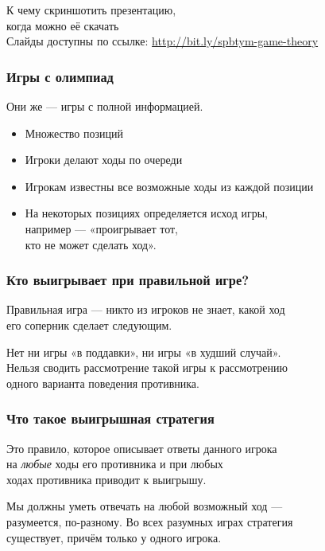 \begin{frame} \begin{center}
	{\Large К чему скриншотить презентацию,\smallskip\\
		когда можно её скачать} \\ [0.9cm]
	{\small Слайды доступны по ссылке: \url{http://bit.ly/spbtym-game-theory}}
\end{center} \end{frame}

\begin{frame} \frametitle{Игры с олимпиад}
	Они же — игры с полной информацией.

\begin{itemize} \itemsep=2.25mm
	\item Множество позиций
	\item Игроки делают ходы по очереди
	\item Игрокам известны все возможные ходы из каждой позиции
	\item На некоторых позициях определяется исход игры, \\
		например — «проигрывает тот, \\
		кто не может сделать ход».
\end{itemize}
\end{frame}

\begin{frame} \frametitle{Кто выигрывает при правильной игре?}
	Правильная игра — никто из игроков не знает, какой ход \\
	его соперник сделает следующим. \bigskip
	
	Нет ни игры «в поддавки», ни игры «в худший случай». \\
	Нельзя сводить рассмотрение такой игры к рассмотрению \\
	одного варианта поведения противника.
\end{frame}

\begin{frame} \frametitle{Что такое выигрышная стратегия}
	Это правило, которое описывает ответы данного игрока \\
	на {\it любые} ходы его противника и при любых \\
	ходах противника приводит к выигрышу. \bigskip
	
	Мы должны уметь отвечать на любой возможный ход — \\
	разумеется, по-разному. Во всех разумных играх стратегия \\
	существует, причём только у одного игрока.
\end{frame}


